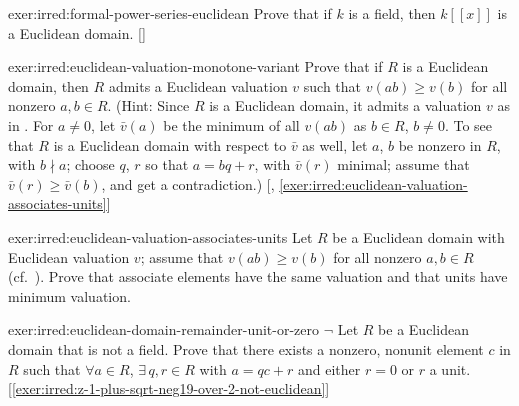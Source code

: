 \begin{exer}{}{exer:irred:formal-power-series-euclidean}
  \exerused{} Prove that if $k$ is a field, then $k[[x]]$ is a
  Euclidean domain. []
\end{exer}
\begin{exer}{}{exer:irred:euclidean-valuation-monotone-variant}
  \exerused{} Prove that if $R$ is a Euclidean domain, then $R$ admits
  a Euclidean valuation $v$ such that $v(ab) \geq v(b)$ for all
  nonzero $a, b \in R$. (Hint: Since $R$ is a Euclidean domain, it
  admits a valuation $v$ as in . For $a \neq 0$,
  let $\bar{v}(a)$ be the minimum of all $v(ab)$ as $b \in R$,
  $b \neq 0$. To see that $R$ is a Euclidean domain with respect to
  $\bar{v}$ as well, let $a$, $b$ be nonzero in $R$, with $b \nmid a$;
  choose $q$, $r$ so that $a = bq + r$, with $\bar{v}(r)$ minimal;
  assume that $\bar{v}(r) \geq \bar{v}(b)$, and get a contradiction.)
  [,
  \ref{exer:irred:euclidean-valuation-associates-units}]
\end{exer}
\begin{exer}{}{exer:irred:euclidean-valuation-associates-units}
  Let $R$ be a Euclidean domain with Euclidean valuation $v$; assume
  that $v(ab) \geq v(b)$ for all nonzero $a, b \in R$ (cf.\
  ).  Prove that
  associate elements have the same valuation and that units have
  minimum valuation.
\end{exer}
\begin{exer}{}{exer:irred:euclidean-domain-remainder-unit-or-zero}
  $\lnot$ Let $R$ be a Euclidean domain that is not a field. Prove
  that there exists a nonzero, nonunit element $c$ in $R$ such that
  $\forall a \in R$, $\exists\, q, r \in R$ with $a = qc + r$ and
  either $r = 0$ or $r$ a
  unit. [\ref{exer:irred:z-1-plus-sqrt-neg19-over-2-not-euclidean}]
\end{exer}
